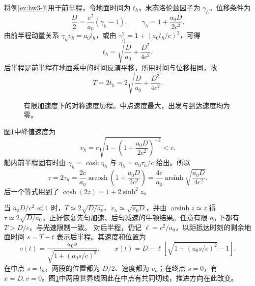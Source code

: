 \begin{solution}
将例\ref{ex:hw3-7}用于前半程，令地面时间为 $t_h$，末态洛伦兹因子为 $\gamma_h$。位移条件为
\[
\frac D2=\frac{c^2}{a_0}(\gamma_h-1),\qquad
\gamma_h=1+\frac{a_0D}{2c^2}.
\]
由前半程动量关系 $\gamma_hv_h=a_0t_h$，或由 $\gamma_h^2=1+(a_0t_h/c)^2$，可得
\[
t_h=\sqrt{\frac D{a_0}+\frac{D^2}{4c^2}}.
\]
后半程是前半程在地面系中的时间反演平移，所用时间与位移相同，故
\[
T=2t_h=2\sqrt{\frac D{a_0}+\frac{D^2}{4c^2}}.
\]
\begin{figure}[H]\centering
{}
\caption{有限加速度下的对称速度历程。中点速度最大，出发与到达速度均为零。}\label{deep3:fig:d3-h12-s}
\end{figure}
图\ref{deep3:fig:d3-h12-s}中峰值速度为
\[
v_h=c\sqrt{1-\left(1+\frac{a_0D}{2c^2}\right)^{-2}}<c.
\]
船内前半程固有时由 $\gamma_h=\cosh\eta_h$ 与
$\eta_h=a_0\tau_h/c$ 给出。所以
\[
\tau=2\tau_h=\frac{2c}{a_0}\operatorname{arcosh}\left(1+\frac{a_0D}{2c^2}\right)
=\frac{4c}{a_0}\operatorname{arsinh}\sqrt{\frac{a_0D}{4c^2}}.
\]
后一个等式用到了 $\cosh(2z)=1+2\sinh^2z$。

当 $a_0D/c^2\ll1$ 时，$T\simeq2\sqrt{D/a_0}$、$v_h\simeq\sqrt{a_0D}$，并由 $\operatorname{arsinh}z\simeq z$ 得 $\tau\simeq2\sqrt{D/a_0}$，正好恢复先匀加速、后匀减速的牛顿结果。任意有限 $a_0$ 下都有 $T>D/c$，与光速限制一致。
对后半程，仍记 $\ell=c^2/a_0$，以距抵达时刻的剩余地面时间 $s=T-t$ 表示后半程。其速度和位置为
\[
v(t)=\frac{a_0s}{\sqrt{1+(a_0s/c)^2}},\qquad
x(t)=D-\ell\left[\sqrt{1+(a_0s/c)^2}-1\right].
\]
在中点 $s=t_h$，两段的位置都为 $D/2$、速度都为 $v_h$；在终点 $s=0$，有 $x=D,v=0$。图\ref{deep3:fig:d3-h12-s}中两段世界线因此在中点有共同切线，推进方向在此改变。

\end{solution}

